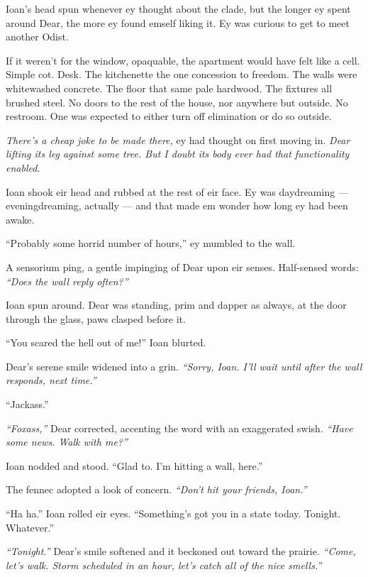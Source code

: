 Ioan's head spun whenever ey thought about the clade, but the longer ey spent around Dear, the more ey found emself liking it. Ey was curious to get to meet another Odist.

If it weren't for the window, opaquable, the apartment would have felt like a cell. Simple cot. Desk. The kitchenette the one concession to freedom. The walls were whitewashed concrete. The floor that same pale hardwood. The fixtures all brushed steel. No doors to the rest of the house, nor anywhere but outside. No restroom. One was expected to either turn off elimination or do so outside.

\emph{There's a cheap joke to be made there,} ey had thought on first moving in. \emph{Dear lifting its leg against some tree. But I doubt its body ever had that functionality enabled.}

Ioan shook eir head and rubbed at the rest of eir face. Ey was daydreaming — eveningdreaming, actually — and that made em wonder how long ey had been awake.

``Probably some horrid number of hours,'' ey mumbled to the wall.

A sensorium ping, a gentle impinging of Dear upon eir senses. Half-sensed words: \emph{``Does the wall reply often?''}

Ioan spun around. Dear was standing, prim and dapper as always, at the door through the glass, paws clasped before it.

``You scared the hell out of me!'' Ioan blurted.

Dear's serene smile widened into a grin. \emph{``Sorry, Ioan. I'll wait until after the wall responds, next time.''}

``Jackass.''

\emph{``Foxass,''} Dear corrected, accenting the word with an exaggerated swish. \emph{``Have some news. Walk with me?''}

Ioan nodded and stood. ``Glad to. I'm hitting a wall, here.''

The fennec adopted a look of concern. \emph{``Don't hit your friends, Ioan.''}

``Ha ha.'' Ioan rolled eir eyes. ``Something's got you in a state today. Tonight. Whatever.''

\emph{``Tonight.''} Dear's smile softened and it beckoned out toward the prairie. \emph{``Come, let's walk. Storm scheduled in an hour, let's catch all of the nice smells.''}
